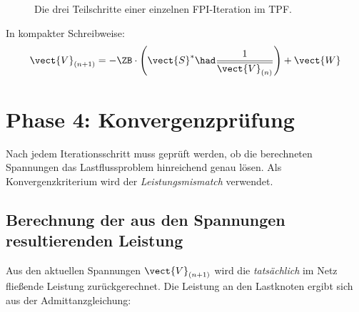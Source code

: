 \begin{figure}[H]
	\centering
	\caption{Die drei Teilschritte einer einzelnen FPI-Iteration im TPF.}
	\label{fig:iteration_steps}
\end{figure}

In kompakter Schreibweise:
\begin{equation}
	\vect{V}_{(n+1)} = -\ZB \cdot \left(\vect{S}^* \had \frac{1}{\overline{\vect{V}_{(n)}}}\right) + \vect{W}
	\label{eq:kompakt_iteration}
\end{equation}

\section{Phase 4: Konvergenzprüfung}
\label{sec:konvergenzpruefung}

Nach jedem Iterationsschritt muss geprüft werden, ob die berechneten Spannungen das Lastflussproblem hinreichend genau lösen. Als Konvergenzkriterium wird der \textit{Leistungsmismatch} verwendet.

\subsection{Berechnung der aus den Spannungen resultierenden Leistung}
\label{subsec:s_calc}

Aus den aktuellen Spannungen $\vect{V}_{(n+1)}$ wird die \textit{tatsächlich} im Netz fließende Leistung zurückgerechnet. Die Leistung an den Lastknoten ergibt sich aus der Admittanzgleichung:

